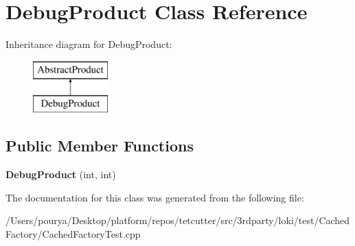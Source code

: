\hypertarget{classDebugProduct}{}\section{Debug\+Product Class Reference}
\label{classDebugProduct}
Inheritance diagram for Debug\+Product\+:\begin{figure}[H]
\begin{center}
\leavevmode
\includegraphics[height=2.000000cm]{classDebugProduct}
\end{center}
\end{figure}
\subsection*{Public Member Functions}
\begin{DoxyCompactItemize}
\item 
\hypertarget{classDebugProduct_ab70534659ec5e8639edf0ea3f6a8758d}{}{\bfseries Debug\+Product} (int, int)\label{classDebugProduct_ab70534659ec5e8639edf0ea3f6a8758d}

\end{DoxyCompactItemize}


The documentation for this class was generated from the following file\+:\begin{DoxyCompactItemize}
\item 
/\+Users/pourya/\+Desktop/platform/repos/tetcutter/src/3rdparty/loki/test/\+Cached\+Factory/Cached\+Factory\+Test.\+cpp\end{DoxyCompactItemize}
